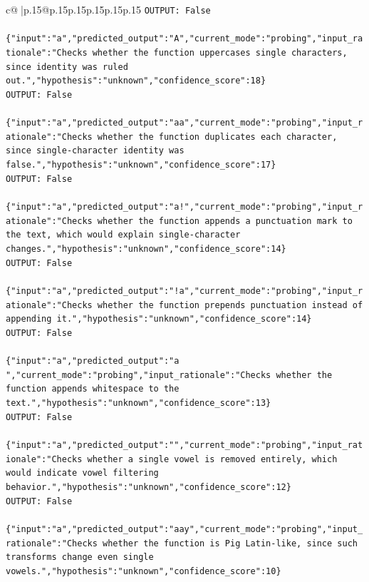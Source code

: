 \documentclass{article}
\begin{document}
{\begin{supertabular}{c@{$\;$}|p{.15\linewidth}@{}p{.15\linewidth}p{.15\linewidth}p{.15\linewidth}p{.15\linewidth}p{.15\linewidth}}
{{{\texttt{OUTPUT: False} \\
\\ 
\texttt{\{"input":"a","predicted\_output":"A","current\_mode":"probing","input\_rationale":"Checks whether the function uppercases single characters, since identity was ruled out.","hypothesis":"unknown","confidence\_score":18\}} \\
\texttt{OUTPUT: False} \\
\\ 
\texttt{\{"input":"a","predicted\_output":"aa","current\_mode":"probing","input\_rationale":"Checks whether the function duplicates each character, since single{-}character identity was false.","hypothesis":"unknown","confidence\_score":17\}} \\
\texttt{OUTPUT: False} \\
\\ 
\texttt{\{"input":"a","predicted\_output":"a!","current\_mode":"probing","input\_rationale":"Checks whether the function appends a punctuation mark to the text, which would explain single{-}character changes.","hypothesis":"unknown","confidence\_score":14\}} \\
\texttt{OUTPUT: False} \\
\\ 
\texttt{\{"input":"a","predicted\_output":"!a","current\_mode":"probing","input\_rationale":"Checks whether the function prepends punctuation instead of appending it.","hypothesis":"unknown","confidence\_score":14\}} \\
\texttt{OUTPUT: False} \\
\\ 
\texttt{\{"input":"a","predicted\_output":"a ","current\_mode":"probing","input\_rationale":"Checks whether the function appends whitespace to the text.","hypothesis":"unknown","confidence\_score":13\}} \\
\texttt{OUTPUT: False} \\
\\ 
\texttt{\{"input":"a","predicted\_output":"","current\_mode":"probing","input\_rationale":"Checks whether a single vowel is removed entirely, which would indicate vowel filtering behavior.","hypothesis":"unknown","confidence\_score":12\}} \\
\texttt{OUTPUT: False} \\
\\ 
\texttt{\{"input":"a","predicted\_output":"aay","current\_mode":"probing","input\_rationale":"Checks whether the function is Pig Latin{-}like, since such transforms change even single vowels.","hypothesis":"unknown","confidence\_score":10\}} \\
}}}
\end{supertabular}}
\end{document}

